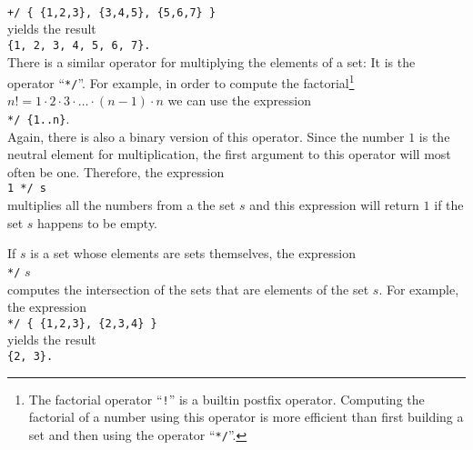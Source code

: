 \\[0.2cm]
\hspace*{1.3cm}
\texttt{+/ \{ \{1,2,3\}, \{3,4,5\}, \{5,6,7\} \}}
\\[0.2cm]
yields the result
\\[0.2cm]
\hspace*{1.3cm}
\texttt{\{1, 2, 3, 4, 5, 6, 7\}.}
\\[0.2cm]
There is a similar operator for multiplying the elements of a set: It is the operator
``\texttt{*/}''.
For example, in order to compute the factorial\footnote{
  The factorial operator ``\texttt{!}'' is a builtin postfix operator.  Computing
  the factorial of a number using this operator is more efficient than first building a set
  and then using the operator ``\texttt{*/}''.
}
$n! = 1 \cdot 2 \cdot 3 \cdot {\dots} \cdot (n-1) \cdot n$ we can use the expression
\\[0.2cm]
\hspace*{1.3cm}
\texttt{*/ \{1..n\}}.
\\[0.2cm]
Again, there is also a binary version of this operator.  Since the number $1$ is the
neutral element for  multiplication, the first argument to this operator will most often
be one.   Therefore, the expression
\\[0.2cm]
\hspace*{1.3cm}
\texttt{1 */ s}
\\[0.2cm]
 multiplies all the numbers from a the set $s$ and this expression will return $1$ if the
 set $s$ happens to be empty.  

If $s$ is a set whose elements are sets themselves, the expression
\\[0.2cm]
\hspace*{1.3cm}
\texttt{*/} $s$
\\[0.2cm]
computes the intersection of the sets that are elements of the set $s$.  For example, the expression
\\[0.2cm]
\hspace*{1.3cm}
\texttt{*/ \{ \{1,2,3\}, \{2,3,4\} \}}
\\[0.2cm]
yields the result
\\[0.2cm]
\hspace*{1.3cm}
\texttt{\{2, 3\}.}

